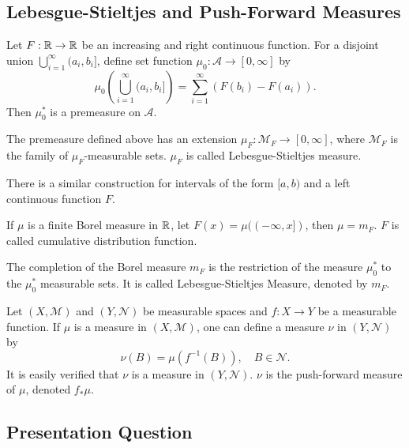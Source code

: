 \documentclass[class=book, crop=false]{standalone}
\begin{document}
        \subsection{Lebesgue-Stieltjes and Push-Forward Measures}
        \begin{theorem}
            Let $F : \mathbb{R} \rightarrow \mathbb{R}$ be an increasing and right continuous function. For a disjoint union $\bigcup^{\infty}_{i = 1} (a_i, b_i]$, define set function $\mu_0 : \mathscr{A} \rightarrow [0, \infty]$ by
            \begin{equation*}
                \mu_0\left(\bigcup^{\infty}_{i = 1} (a_i, b_i]\right) = \sum^{\infty}_{i = 1} (F(b_i) - F(a_i)).
            \end{equation*}
            Then $\mu^*_0$ is a premeasure on $\mathscr{A}$.
        \end{theorem}

        \begin{definition}
            The premeasure defined above has an extension $\mu_F : \mathscr{M}_F \rightarrow [0, \infty]$, where $\mathscr{M}_F$ is the family of $\mu_F$-measurable sets. $\mu_F$ is called Lebesgue-Stieltjes measure.
        \end{definition}
        
        \begin{remark}
            There is a similar construction for intervals of the form $[a, b)$ and a left continuous function $F$.
        \end{remark}

        \begin{theorem}
            If $\mu$ is a finite Borel measure in $\mathbb{R}$, let $F(x) = \mu((-\infty, x])$, then $\mu = m_F$. $F$ is called cumulative distribution function.
        \end{theorem}

        \begin{theorem}
            The completion of the Borel measure $m_F$ is the restriction of the measure $\mu^*_0$ to the $\mu^*_0$ measurable sets. It is called Lebesgue-Stieltjes Measure, denoted by $m_F$.
        \end{theorem}

        \begin{definition}
            Let $(X, \mathscr{M})$ and $(Y, \mathscr{N})$ be measurable spaces and $f : X \rightarrow Y$ be a measurable function. If $\mu$ is a measure in $(X, \mathscr{M})$, one can define a measure $\nu$ in $(Y, \mathscr{N})$ by
            \begin{equation*}
                \nu(B) = \mu(f^{-1}(B)), \quad B \in \mathscr{N}.
            \end{equation*}
            It is easily verified that $\nu$ is a measure in $(Y, \mathscr{N})$. $\nu$ is the push-forward measure of $\mu$, denoted $f_*\mu$.
        \end{definition}
        
        \subsection{Presentation Question}
\end{document}
